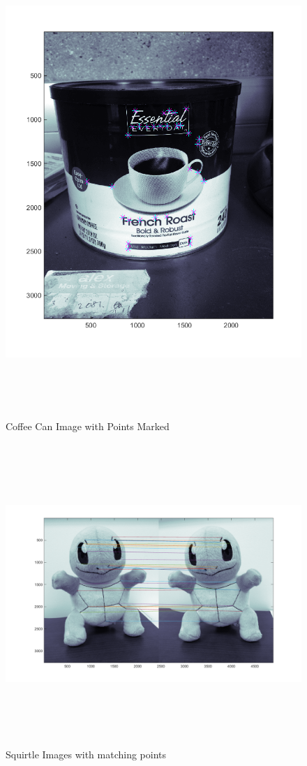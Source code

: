 \documentclass[11pt,psfig]{article}
\begin{document}
\begin{figure}[H]
\centering
\includegraphics[height=7in]{coffeeCan_prob2Points.png}
\caption{Coffee Can Image with Points Marked}
\label{p2c}
\end{figure}

\begin{figure}[H]
\centering
\includegraphics[height=4.5in]{squirtle_prob2Matches.png}
\caption{Squirtle Images with matching points}
\label{p2d}
\end{figure}
\end{document}

